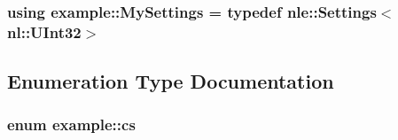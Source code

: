 \subsubsection[{My\+Settings}]{\setlength{\rightskip}{0pt plus 5cm}using {\bf example\+::\+My\+Settings} = typedef {\bf nle\+::\+Settings}$<${\bf nl\+::\+U\+Int32}$>$}\label{namespaceexample_a5efa1dbb95bf11993a49738e533e7d0a}


\subsection{Enumeration Type Documentation}
\hypertarget{namespaceexample_a229123c56827091122d3cc29bf73a6c0}{}
\subsubsection[{cs}]{\setlength{\rightskip}{0pt plus 5cm}enum {\bf example\+::cs}\hspace{0.3cm}{\ttfamily [strong]}}\label{namespaceexample_a229123c56827091122d3cc29bf73a6c0}
